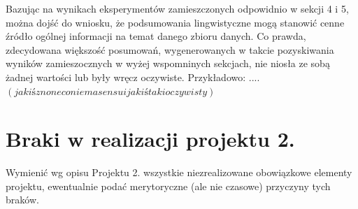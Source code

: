 \documentclass{classrep}
\begin{document}
Bazując na wynikach eksperymentów zamieszczonych odpowidnio w sekcji 4 i 5, można dojść do wniosku, że podsumowania lingwistyczne
mogą stanowić cenne źródło ogólnej informacji na temat danego zbioru danych. Co prawda, zdecydowana większość posumowań, wygenerowanych w takcie pozyskiwania wyników zamieszocznych w wyżej 
wspomninych sekcjach, nie niosła ze sobą żadnej wartości lub były wręcz oczywiste. Przykładowo: .... $(jakiś z none co nie ma sensu i jakiś taki oczywisty)$





% 
% 
% 

\section{Braki w realizacji projektu 2.}
Wymienić wg opisu Projektu 2. wszystkie niezrealizowane obowiązkowe elementy projektu, ewentualnie
podać merytoryczne (ale nie czasowe) przyczyny tych braków. 
\end{document}
